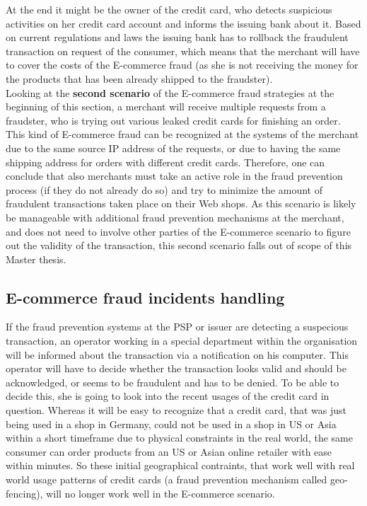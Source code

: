 At the end it might be the owner of the credit card, who detects suspicious activities on her credit card account and informs the issuing bank about it. Based on current regulations and laws the issuing bank has to rollback the fraudulent transaction on request of the consumer, which means that the merchant will have to cover the costs of the E-commerce fraud (as she is not receiving the money for the products that has been already shipped to the fraudster). \\

Looking at the \textbf{second scenario} of the E-commerce fraud strategies at the beginning of this section, a merchant will receive multiple requests from a fraudster, who is trying out various leaked credit cards for finishing an order. This kind of E-commerce fraud can be recognized at the systems of the merchant due to the same source \gls{IP} address of the requests, or due to having the same shipping address for orders with different credit cards. Therefore, one can conclude that also merchants must take an active role in the fraud prevention process (if they do not already do so) and try to minimize the amount of fraudulent transactions taken place on their Web shops. As this scenario is likely be manageable with additional fraud prevention mechanisms at the merchant, and does not need to involve other parties of the E-commerce scenario to figure out the validity of the transaction, this second scenario falls out of scope of this Master thesis.


\subsection{E-commerce fraud incidents handling}
\label{subsec:e_commerce_fraud_handling}

If the fraud prevention systems at the \gls{PSP} or issuer are detecting a suspecious transaction, an operator working in a special department within the organisation will be informed about the transaction via a notification on his computer. This operator will have to decide whether the transaction looks valid and should be acknowledged, or seems to be fraudulent and has to be denied. To be able to decide this, she is going to look into the recent usages of the credit card in question. Whereas it will be easy to recognize that a credit card, that was just being used in a shop in Germany, could not be used in a shop in US or Asia within a short timeframe due to physical constraints in the real world, the same consumer can order products from an US or Asian online retailer with ease within minutes. So these initial geographical contraints, that work well with real world usage patterns of credit cards (a fraud prevention mechanism called geo-fencing), will no longer work well in the E-commerce scenario. \\

